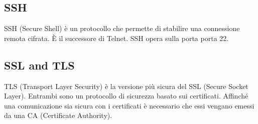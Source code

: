 \documentclass{article}
\begin{document}
\subsection{SSH}

SSH (Secure Shell) è un protocollo che permette di stabilire una connessione remota cifrata. È il successore di Telnet. SSH opera sulla porta porta 22.

\subsection{SSL and TLS}

TLS (Transport Layer Security) è la versione più sicura del SSL (Secure Socket Layer). 
Entrambi sono un protocollo di sicurezza basato sui certificati. Affinché una comunicazione sia sicura con i certificati è necessario che essi vengano emessi da una CA (Certificate Authority).
\end{document}
